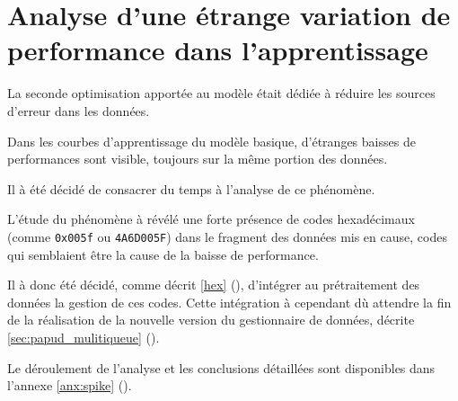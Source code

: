 \section{Analyse d'une étrange variation de performance dans l'apprentissage} \label{sec:spike}
La seconde optimisation apportée au modèle était dédiée à réduire les sources d'erreur dans les données.

Dans les courbes d'apprentissage du modèle basique, d'étranges baisses de performances sont visible, toujours sur la même portion des données.

Il à été décidé de consacrer du temps à l'analyse de ce phénomène.

L'étude du phénomène à révélé une forte présence de codes hexadécimaux (comme \lstinline|0x005f| ou \lstinline|4A6D005F|) dans le fragment des données mis en cause, codes qui semblaient être la cause de la baisse de performance.

Il à donc été décidé, comme décrit \autoref{hex} (), d'intégrer au prétraitement des données la gestion de ces codes.
Cette intégration à cependant dù attendre la fin de la réalisation de la nouvelle version du gestionnaire de données, décrite \autoref{sec:papud_mulitiqueue} ().

Le déroulement de l'analyse et les conclusions détaillées sont disponibles dans l'annexe \ref{anx:spike} ().
